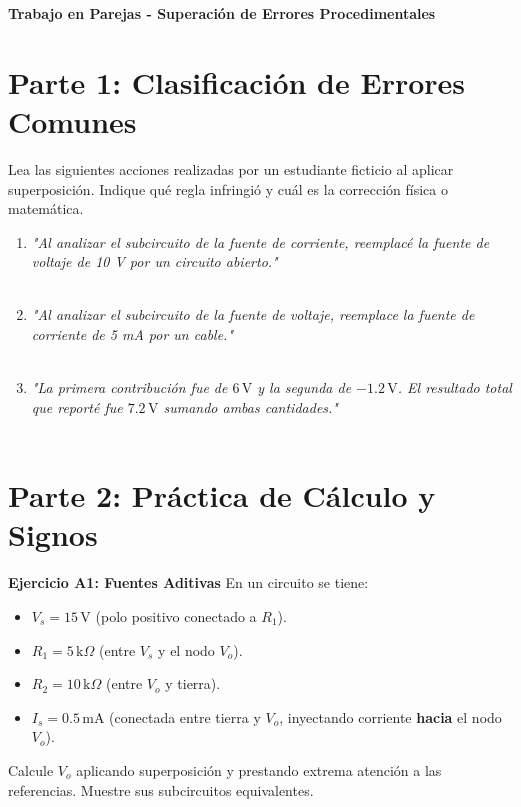 \documentclass[11pt, a4paper]{article}
\begin{document}
\begin{tcolorbox}[colback=ucbblue!5!white, colframe=ucbblue, title=\textbf{Práctica de Consolidación: Superposición (Path A)}]
    \centering \textbf{Trabajo en Parejas - Superación de Errores Procedimentales}
\end{tcolorbox}

\section*{Parte 1: Clasificación de Errores Comunes}
Lea las siguientes acciones realizadas por un estudiante ficticio al aplicar superposición. Indique qué regla infringió y cuál es la corrección física o matemática.

\begin{enumerate}
    \item \textit{"Al analizar el subcircuito de la fuente de corriente, reemplacé la fuente de voltaje de 10 V por un circuito abierto."} \\ \hrulefill \\ \hrulefill
    
    \item \textit{"Al analizar el subcircuito de la fuente de voltaje, reemplace la fuente de corriente de 5 mA por un cable."} \\ \hrulefill \\ \hrulefill
    
    \item \textit{"La primera contribución fue de $6\,\text{V}$ y la segunda de $-1.2\,\text{V}$. El resultado total que reporté fue $7.2\,\text{V}$ sumando ambas cantidades."} \\ \hrulefill \\ \hrulefill
\end{enumerate}

\section*{Parte 2: Práctica de Cálculo y Signos}

\textbf{Ejercicio A1: Fuentes Aditivas}
En un circuito se tiene:
\begin{itemize}
    \item $V_s = 15\,\text{V}$ (polo positivo conectado a $R_1$).
    \item $R_1 = 5\,\text{k}\Omega$ (entre $V_s$ y el nodo $V_o$).
    \item $R_2 = 10\,\text{k}\Omega$ (entre $V_o$ y tierra).
    \item $I_s = 0.5\,\text{mA}$ (conectada entre tierra y $V_o$, inyectando corriente \textbf{hacia} el nodo $V_o$).
\end{itemize}
Calcule $V_o$ aplicando superposición y prestando extrema atención a las referencias. Muestre sus subcircuitos equivalentes.
\end{document}
